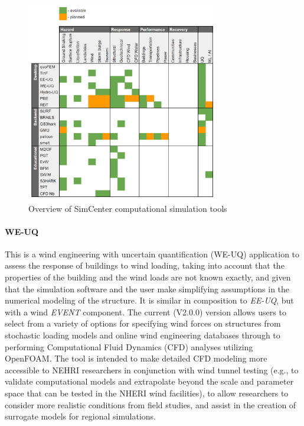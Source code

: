 \begin{figure}[htb]
    \centering
    \includegraphics[width=0.75\textwidth, angle = 0]{Figures/tool_overview.png}
    \caption{Overview of SimCenter computational simulation tools}
    \label{fig:intro_tool_overview}
\end{figure}

\paragraph{WE-UQ} This is a wind engineering with uncertain quantification (WE-UQ) application to assess the response of buildings to wind loading, taking into account that the properties of the building and the wind loads are not known exactly, and given that the simulation software and the user make simplifying assumptions in the numerical modeling of the structure. It is similar in composition to \emph{EE-UQ}, but with a wind \emph{EVENT} component.  The current (V2.0.0) version allows users to select from a variety of options for specifying wind forces on structures from stochastic loading models and online wind engineering databases through to performing Computational Fluid Dynamics (CFD) analyses utilizing OpenFOAM. The tool is intended to make detailed CFD modeling more accessible to NEHRI researchers in conjunction with wind tunnel testing (e.g., to validate computational models and extrapolate beyond the scale and parameter space that can be tested in the NHERI wind facilities), to allow researchers to consider more realistic conditions from field studies, and assist in the creation of surrogate models for regional simulations. 

